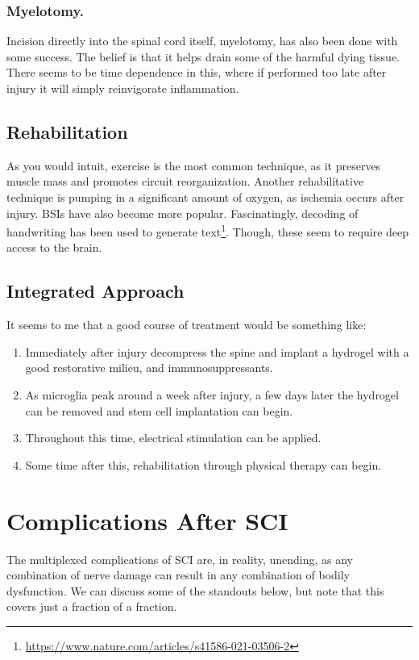 \documentclass[12pt]{report}
\begin{document}
\subsubsection{Myelotomy.}
Incision directly into the spinal cord itself, myelotomy, has also been done with some success. The belief is that it helps drain some of the harmful dying tissue. There seems to be time dependence in this, where if performed too late after injury it will simply reinvigorate inflammation. 

\subsection{Rehabilitation}
As you would intuit, exercise is the most common technique, as it preserves muscle mass and promotes circuit reorganization. Another rehabilitative technique is pumping in a significant amount of oxygen, as ischemia occurs after injury. BSIs have also become more popular. Fascinatingly, decoding of handwriting has been used to generate text\footnote{\url{https://www.nature.com/articles/s41586-021-03506-2}}. Though, these seem to require deep access to the brain. 

\subsection{Integrated Approach}
It seems to me that a good course of treatment would be something like: 

\begin{enumerate}
    \item Immediately after injury decompress the spine and implant a hydrogel with a good restorative milieu, and immunosuppressants.
    \item As microglia peak around a week after injury, a few days later the hydrogel can be removed and stem cell implantation can begin. 
    \item Throughout this time, electrical stimulation can be applied. 
    \item Some time after this, rehabilitation through physical therapy can begin. 
\end{enumerate}

\section{Complications After SCI}

The multiplexed complications of SCI are, in reality, unending, as any combination of nerve damage can result in any combination of bodily dysfunction. We can discuss some of the standouts below, but note that this covers just a fraction of a fraction. 
\end{document}
